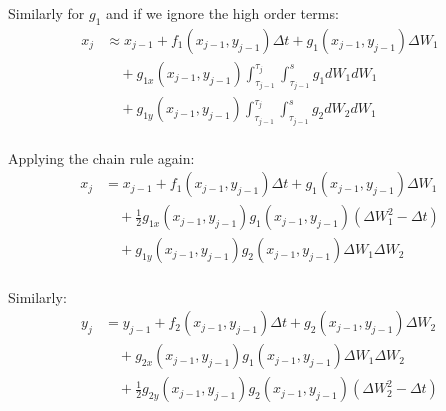 \begin{frame}
Similarly for $g_1$ and if we ignore the high order terms:
	\begin{equation*}
	\begin{split}
	x_{j} & \approx x_{j-1}+f_1(x_{j-1},y_{j-1})\Delta t+g_1(x_{j-1},y_{j-1})\Delta W_1\\
	& \quad +g_{1x}(x_{j-1},y_{j-1})\int_{\tau_{j-1}}^{\tau_{j}}
	\int_{\tau_{j-1}}^{s}g_1dW_1dW_1\\
	& \quad	+g_{1y}(x_{j-1},y_{j-1})\int_{\tau_{j-1}}^{\tau_{j}}\int_{\tau_{j-1}}^{s}
	g_2dW_2dW_1\\
	\end{split}
	\end{equation*}	
\end{frame}


\begin{frame}
Applying the chain rule again:
	\begin{equation*}
	\begin{split}
	x_{j} &= x_{j-1}+f_1(x_{j-1},y_{j-1})\Delta t+g_1(x_{j-1},y_{j-1})\Delta W_1\\
	&\quad +\frac{1}{2}g_{1x}(x_{j-1},y_{j-1})g_{1}(x_{j-1},y_{j-1})(\Delta W_1^2-\Delta t)\\
	&\quad +g_{1y}(x_{j-1},y_{j-1})g_2(x_{j-1},y_{j-1})\Delta W_1 \Delta W_2\\
	\end{split}
	\end{equation*}
\end{frame}

\begin{frame}
Similarly:
\begin{equation*}
	\begin{split}
	y_{j}&=y_{j-1}+f_2(x_{j-1},y_{j-1})\Delta t+g_2(x_{j-1},y_{j-1})\Delta W_2\\
	&\quad +g_{2x}(x_{j-1},y_{j-1})g_{1}(x_{j-1},y_{j-1})\Delta W_1 \Delta W_2\\
	&\quad +\frac{1}{2}g_{2y}(x_{j-1},y_{j-1})g_2(x_{j-1},y_{j-1})(\Delta W_2^2-\Delta t)\\
	\end{split}
	\end{equation*}
\end{frame}




